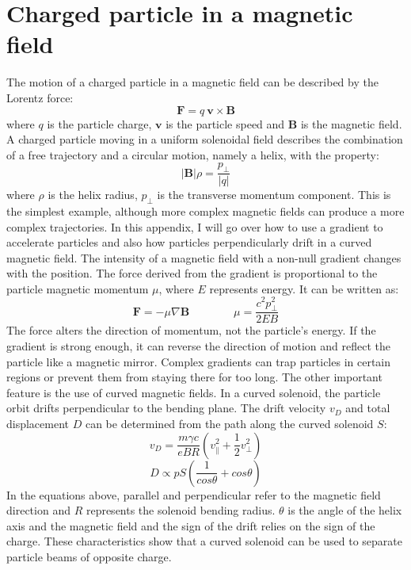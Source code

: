 \chapter{Charged particle in a magnetic field}\label{appendix1}
The motion of a charged particle in a magnetic field can be described by the Lorentz force:
\begin{equation}
    \mathbf{F}=q \ \mathbf{v}\times\mathbf{B}
\end{equation}
where $q$ is the particle charge, $\mathbf{v}$ is the particle speed and $\mathbf{B}$ is 
the magnetic field.
A charged particle moving in a uniform solenoidal field describes the 
combination of a free trajectory and a circular motion, namely a helix, with the property:
\begin{equation}\label{partincamp}
    |\mathbf{B}|\rho=\frac{p_\perp}{|q|}
\end{equation}
where $\rho$ is the helix radius, $p_\perp$ is the transverse momentum component.
This is the simplest example, although more complex magnetic fields can 
produce a more complex trajectories. In this appendix, I will go over how to 
use a gradient to accelerate particles and also how particles perpendicularly 
drift in a curved magnetic field. The intensity of a magnetic field with a 
non-null gradient changes with the position. The force derived from the gradient is 
proportional to the particle magnetic momentum $\mu$, where $E$ represents 
energy. It can be written as:
\begin{equation}
   \mathbf{F}=-\mu \nabla \mathbf{B} \qquad \qquad \mu=\frac{c^2 p_\perp^2}{2 E B}
\end{equation}
The force alters the direction of momentum, not the particle's energy. If the 
gradient is strong enough, it can reverse the direction of motion and reflect 
the particle like a magnetic mirror. Complex gradients can trap particles in 
certain regions or prevent them from staying there for too long.
The other important feature is the use of curved magnetic fields. In a curved 
solenoid, the particle orbit drifts perpendicular to the bending plane. 
The drift velocity $v_D$ and total displacement $D$ can be determined from 
the path along the curved solenoid $S$:
\begin{equation}
    v_D=\frac{m \gamma c}{e B R}(v_\parallel ^2+\frac{1}{2}v_\perp ^2)
\end{equation}
\begin{equation}
    D \propto p S (\frac{1}{cos \theta} + cos \theta)
\end{equation}
In the equations above, parallel and perpendicular refer to the magnetic field direction 
and $R$ represents the solenoid bending radius. $\theta$ is 
the angle of the helix axis and the magnetic field and the sign of the drift 
relies on the sign of the charge. These characteristics show that a curved 
solenoid can be used to separate particle beams of opposite charge.
